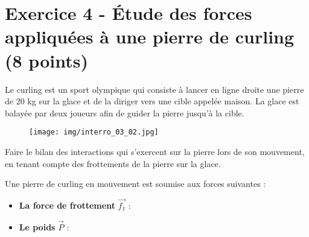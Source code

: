 \documentclass[answers]{exam}
\begin{document}
\section*{Exercice 4 - Étude des forces appliquées à une pierre de curling (8 points)}

Le curling est un sport olympique qui consiste à lancer en ligne droite une pierre de 20 kg sur la glace et de la diriger vers une cible appelée maison. La glace est balayée par deux joueurs afin de guider la pierre jusqu’à la cible.
\begin{figure}[H]
  \centering
  \texttt{[image: img/interro\_03\_02.jpg]}
\end{figure}
\begin{questions}
  \question[2] Faire le bilan des interactions qui s’exercent sur la pierre lors de son mouvement, en tenant compte des frottements de la pierre sur la glace.
  \begin{solution}
    Une pierre de curling en mouvement est soumise aux forces suivantes :
    
    \begin{itemize}
        \item \textbf{La force de frottement} $\vec{f_1}$ :  
        
        \item \textbf{Le poids} $\vec{P}$ :  
    

\end{itemize}
\end{solution}
\end{questions}
\end{document}
